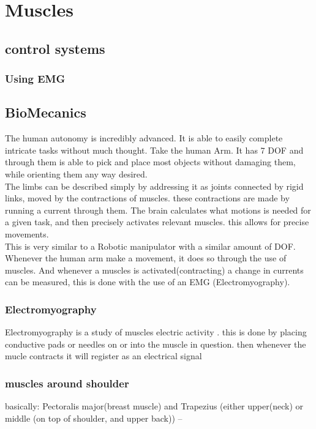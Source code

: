 \chapter{Muscles}\label{ch:Beef}
\section{control systems}
\subsection{Using EMG}

\section{BioMecanics}
The human autonomy is incredibly advanced. It is able to easily complete intricate tasks without much thought. 
Take the human Arm. It has 7 DOF and through them is able to pick and place most objects without damaging them, while orienting them any way desired. \cite{Redundan25:online}\\ 
The limbs can be described simply by addressing it as joints connected by rigid links, moved by the contractions of muscles. these contractions are made by running a current through them. The brain calculates what motions is needed for a given task, and then precisely activates relevant muscles. this allows for precise movements. \\
This is very similar to a Robotic manipulator with a similar amount of DOF.
Whenever the human arm make a movement, it does so through the use of muscles. And whenever a muscles is activated(contracting)  a change in currents can be measured, this is done with the use of an EMG (Electromyography). \cite{Electrom76:online}

\subsection{Electromyography}
Electromyography is a study of muscles electric activity \cite{Nerveled75:online}.
this is done by placing conductive pads or needles on or into the muscle in question. then whenever the mucle contracts it will register as an electrical signal
\subsection{muscles around shoulder}
basically: Pectoralis major(breast muscle) and Trapezius (either upper(neck) or middle (on top of shoulder, and upper back)) -- 